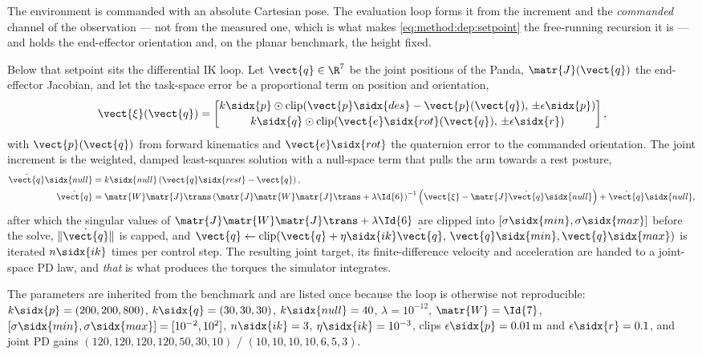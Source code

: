 The environment is commanded with an absolute Cartesian pose. The evaluation loop forms it from the
increment and the \emph{commanded} channel of the observation --- not from the measured one, which
is what makes \eqref{eq:method:dep:setpoint} the free-running recursion it is --- and holds the
end-effector orientation and, on the planar benchmark, the height fixed.

Below that setpoint sits the differential \ac{IK} loop. Let $\vect{q}\in\R^{7}$ be the joint
positions of the Panda, $\matr{J}(\vect{q})$ the end-effector Jacobian, and let the task-space error be a
proportional term on position and orientation,
\begin{equation}\label{eq:method:dep:taskerr}
  \vect{\xi}(\vect{q})
  = \begin{bmatrix}
      k\sidx{p}\odot\operatorname{clip}\!\left(\vect{p}\sidx{des}-\vect{p}(\vect{q}),\,\pm\epsilon\sidx{p}\right)\\[2pt]
      k\sidx{q}\odot\operatorname{clip}\!\left(\vect{e}\sidx{rot}(\vect{q}),\,\pm\epsilon\sidx{r}\right)
    \end{bmatrix},
\end{equation}
with $\vect{p}(\vect{q})$ from forward kinematics and $\vect{e}\sidx{rot}$ the quaternion error to the
commanded orientation. The joint increment is the weighted, damped least-squares solution with a
null-space term that pulls the arm towards a rest posture,
\begin{align}
  \dot{\vect{q}}\sidx{null} &= k\sidx{null}\left(\vect{q}\sidx{rest}-\vect{q}\right),
    \label{eq:method:dep:null}\\
  \dot{\vect{q}}
    &= \matr{W}\matr{J}\trans
       \left(\matr{J}\matr{W}\matr{J}\trans + \lambda\Id{6}\right)^{-1}
       \left(\vect{\xi} - \matr{J}\dot{\vect{q}}\sidx{null}\right)
     + \dot{\vect{q}}\sidx{null},
    \label{eq:method:dep:dls}
\end{align}
after which the singular values of $\matr{J}\matr{W}\matr{J}\trans + \lambda\Id{6}$ are clipped into
$[\sigma\sidx{min},\sigma\sidx{max}]$ before the solve, $\|\dot{\vect{q}}\|$ is capped, and
$\vect{q} \leftarrow \operatorname{clip}(\vect{q}+\eta\sidx{ik}\dot{\vect{q}},\,\vect{q}\sidx{min},\vect{q}\sidx{max})$
is iterated $n\sidx{ik}$ times per control step. The resulting joint target, its finite-difference
velocity and acceleration are handed to a joint-space PD law, and \emph{that} is what produces the
torques the simulator integrates.

The parameters are inherited from the benchmark and are listed once because the loop is otherwise
not reproducible: $k\sidx{p} = (200,200,800)$, $k\sidx{q} = (30,30,30)$, $k\sidx{null} = 40$,
$\lambda = 10^{-12}$, $\matr{W} = \Id{7}$, $[\sigma\sidx{min},\sigma\sidx{max}] = [10^{-2},10^{2}]$,
$n\sidx{ik} = 3$, $\eta\sidx{ik} = 10^{-3}$, clips $\epsilon\sidx{p} = 0.01\,\textrm{m}$ and
$\epsilon\sidx{r} = 0.1$, and joint PD gains
$(120,120,120,120,50,30,10)$ / $(10,10,10,10,6,5,3)$.

